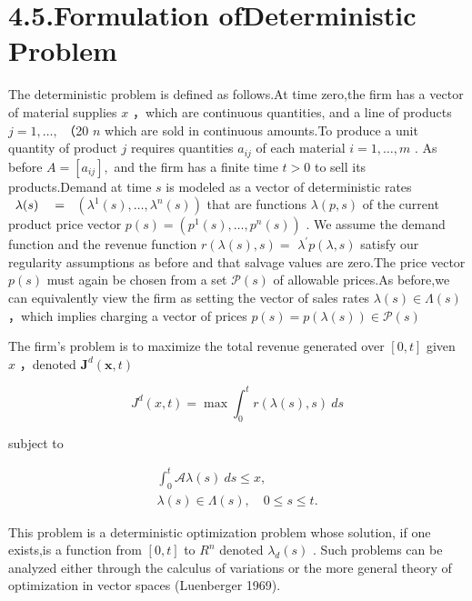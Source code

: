 \section{4.5.Formulation ofDeterministic
Problem}\label{formulation-ofdeterministic-problem}

The deterministic problem is defined as follows.At time zero,the firm
has a vector of material supplies \(x\) ，which are continuous
quantities, and a line of products \(j = 1 , \dots ,\) （20 \(n\) which
are sold in continuous amounts.To produce a unit quantity of product
\(j\) requires quantities \(a _ { i j }\) of each material
\(i = 1 , \ldots , m\) . As before \(A = [ a _ { i j } ] ,\) and the
firm has a finite time \(t > 0\) to sell its products.Demand at time
\(s\) is modeled as a vector of deterministic rates
\(\begin{array} { r l } { \lambda ( s ) } & { { } = } \end{array}\)
\(( \lambda ^ { 1 } ( s ) , \ldots , \lambda ^ { n } ( s ) )\) that are
functions \(\lambda ( p , s )\) of the current product price vector
\(p ( s ) = ( p ^ { 1 } ( s ) , \ldots , p ^ { n } ( s ) )\) . We assume
the demand function and the revenue function
\(r ( \lambda ( s ) , s ) =\) \(\lambda ^ { \prime } p ( \lambda , s )\)
satisfy our regularity assumptions as before and that salvage values are
zero.The price vector \(p ( s )\) must again be chosen from a set
\(\mathcal { P } ( s )\) of allowable prices.As before,we can
equivalently view the firm as setting the vector of sales rates
\(\lambda ( s ) \in \Lambda ( s )\) ，which implies charging a vector of
prices \(p ( s ) = p ( \lambda ( s ) ) \in \mathcal { P } ( s )\)

The firm's problem is to maximize the total revenue generated over
\([ 0 , t ]\) given \(x\) ，denoted
\(\boldsymbol { J } ^ { d } ( \boldsymbol { x } , t )\)

\[
J ^ { d } ( x , t ) = \operatorname* { m a x } \int _ { 0 } ^ { t } r ( \lambda ( s ) , s ) \ d s
\]

subject to

\[
\begin{array} { l } { \displaystyle \int _ { 0 } ^ { t } { \mathcal A } \lambda ( s ) ~ d s \leqslant x , } \\ { \lambda ( s ) \in \Lambda ( s ) , \quad 0 \leqslant s \leqslant t . } \end{array}
\]

This problem is a deterministic optimization problem whose solution, if
one exists,is a function from \([ 0 , t ]\) to \(R ^ { n }\) denoted
\(\lambda _ { d } ( s )\) . Such problems can be analyzed either through
the calculus of variations or the more general theory of optimization in
vector spaces (Luenberger 1969).

